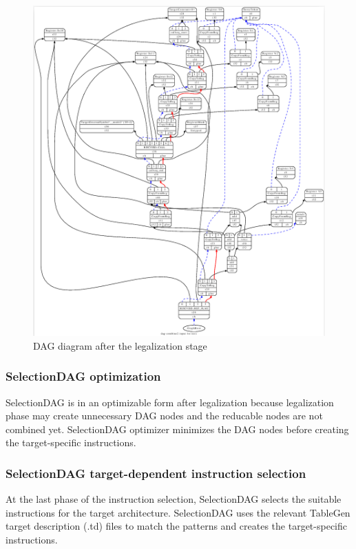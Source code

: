 \begin{figure}
  \centering
  \includegraphics[scale=0.4]{the_llvm_compiler/dag_after_legalization.png}
  \caption{DAG diagram after the legalization stage}
  \label{fig:dag_after_legalization}
\end{figure}


\subsubsection{SelectionDAG optimization}
SelectionDAG is in an optimizable form after legalization because legalization phase may create unnecessary DAG nodes and the reducable nodes are not combined yet. SelectionDAG optimizer minimizes the DAG nodes before creating the target-specific instructions.

\subsubsection{SelectionDAG target-dependent instruction selection}
At the last phase of the instruction selection, SelectionDAG selects the suitable instructions for the target architecture. SelectionDAG uses the relevant TableGen target description (.td) files to match the patterns and creates the target-specific instructions.

